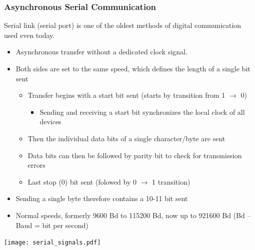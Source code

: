 \documentclass{beamer}
\begin{document}
\begin{frame}
\frametitle{Asynchronous Serial Communication}

\footnotesize
Serial link (serial port) is one of the oldest methods of digital communication used even today.
\begin{itemize}
\footnotesize
\item Asynchronous transfer without a dedicated clock signal.
\item Both sides are set to the same speed, which defines the length of a single bit sent
\begin{itemize}
\scriptsize
\item Transfer begins with a start bit sent (starts by transition from 1 $\rightarrow$ 0)
\begin{itemize}
\scriptsize
\item Sending and receiving a start bit synchronizes the local clock of all devices
\end{itemize}
\scriptsize
\item Then the individual data bits of a single character/byte are sent
\item Data bits can then be followed by parity bit to check for transmission errors
\item Last stop (0) bit sent (folowed by 0 $\rightarrow$ 1 transition)
\end{itemize}
\footnotesize
\item Sending a single byte therefore contains a 10-11 bit sent
\item Normal speeds, formerly 9600 Bd to 115200 Bd, now up to 921600 Bd (Bd -- Baud = bit per second)
\end{itemize}

\begin{center}
\texttt{[image: serial\_signals.pdf]}
\end{center}
\end{frame}
\end{document}
